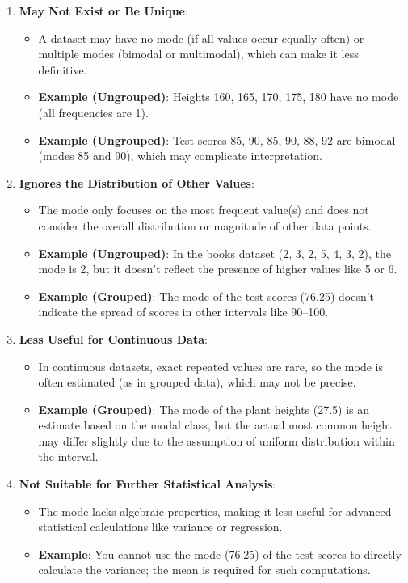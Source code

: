 \documentclass[11pt]{article}
\begin{document}
\begin{enumerate}
    \item \textbf{May Not Exist or Be Unique}:
    \begin{itemize}
        \item A dataset may have no mode (if all values occur equally often) or multiple modes (bimodal or multimodal), which can make it less definitive.
        \item \textbf{Example (Ungrouped)}: Heights 160, 165, 170, 175, 180 have no mode (all frequencies are 1).
        \item \textbf{Example (Ungrouped)}: Test scores 85, 90, 85, 90, 88, 92 are bimodal (modes 85 and 90), which may complicate interpretation.
    \end{itemize}

    \item \textbf{Ignores the Distribution of Other Values}:
    \begin{itemize}
        \item The mode only focuses on the most frequent value(s) and does not consider the overall distribution or magnitude of other data points.
        \item \textbf{Example (Ungrouped)}: In the books dataset (2, 3, 2, 5, 4, 3, 2), the mode is 2, but it doesn’t reflect the presence of higher values like 5 or 6.
        \item \textbf{Example (Grouped)}: The mode of the test scores (76.25) doesn’t indicate the spread of scores in other intervals like 90--100.
    \end{itemize}

    \item \textbf{Less Useful for Continuous Data}:
    \begin{itemize}
        \item In continuous datasets, exact repeated values are rare, so the mode is often estimated (as in grouped data), which may not be precise.
        \item \textbf{Example (Grouped)}: The mode of the plant heights (27.5) is an estimate based on the modal class, but the actual most common height may differ slightly due to the assumption of uniform distribution within the interval.
    \end{itemize}

    \item \textbf{Not Suitable for Further Statistical Analysis}:
    \begin{itemize}
        \item The mode lacks algebraic properties, making it less useful for advanced statistical calculations like variance or regression.
        \item \textbf{Example}: You cannot use the mode (76.25) of the test scores to directly calculate the variance; the mean is required for such computations.
    \end{itemize}
\end{enumerate}
\end{document}
